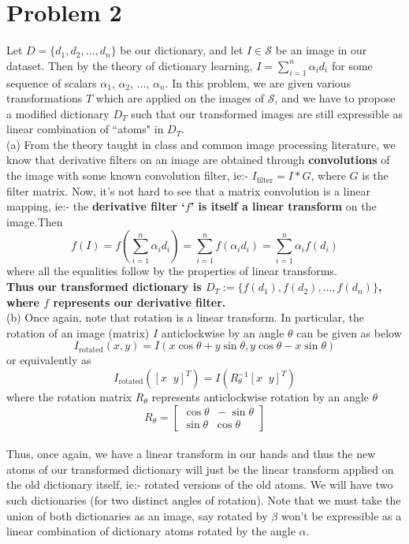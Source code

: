 \documentclass[a4paper,14pt]{article}
\numberwithin{definition}{section}
\numberwithin{mytheorem}{subsection}
\begin{document}
\section{Problem 2}
Let $D = \{d_1, d_2, ..., d_n\}$ be our dictionary, and let $I\in\mathcal{S}$ be an image in our dataset. Then by the theory of dictionary learning, $I = \sum^{n}_{i = 1}\alpha_id_i$ for some sequence of scalars $\alpha_1$, $\alpha_2$, $\hdots$, $\alpha_n$. In this problem, we are given various transformations $T$ which are applied on the images of $\mathcal{S}$, and we have to propose a modified dictionary $D_T$ such that our transformed images are still expressible as linear combination of ``atoms" in $D_T$.\\
(a) From the theory taught in class and common image processing literature, we know that derivative filters on an image are obtained through \textbf{convolutions} of the image with some known convolution filter, ie:- $I_{\mathrm{filter}} = I * G$, where $G$ is the filter matrix. Now, it's not hard to see that a matrix convolution is a linear mapping, ie:- the \textbf{derivative filter `$f$' is itself a linear transform} on the image.Then 
$$f(I) = f(\sum^{n}_{i = 1}\alpha_id_i) = \sum^{n}_{i = 1}f(\alpha_id_i) = \sum^{n}_{i = 1}\alpha_if(d_i)$$
where all the equalities follow by the properties of linear transforms.\\
\textbf{Thus our transformed dictionary is $D_T := \{f(d_1), f(d_2), \hdots, f(d_n)\}$, where $f$ represents our derivative filter.}
\\
(b) Once again, note that rotation is a linear transform. In particular, the rotation of an image (matrix) $I$ anticlockwise by an angle $\theta$ can be given as below
$$I_{\mathrm{rotated}}(x, y) = I(x\cos\theta+y\sin\theta, y\cos\theta-x\sin\theta)$$
or equivalently as
$$I_{\mathrm{rotated}}([x\;\;y]^T) = I(R_{\theta}^{-1}[x\;\;y]^T)$$
where the rotation matrix $R_{\theta}$ represents anticlockwise rotation by an angle $\theta$
$$R_{\theta} = \begin{bmatrix}
    \cos\theta \;\; -\sin\theta\\
\sin\theta \;\; \cos\theta
\end{bmatrix}$$ 
\\
Thus, once again, we have a linear transform in our hands and thus the new atoms of our transformed dictionary will just be the linear transform applied on the old dictionary itself, ie:- rotated versions of the old atoms. We will have two such dictionaries (for two distinct angles of rotation). Note that we must take the union of both dictionaries as an image, say rotated by $\beta$ won't be expressible as a linear combination of dictionary atoms rotated by the angle $\alpha$.\\
\end{document}
